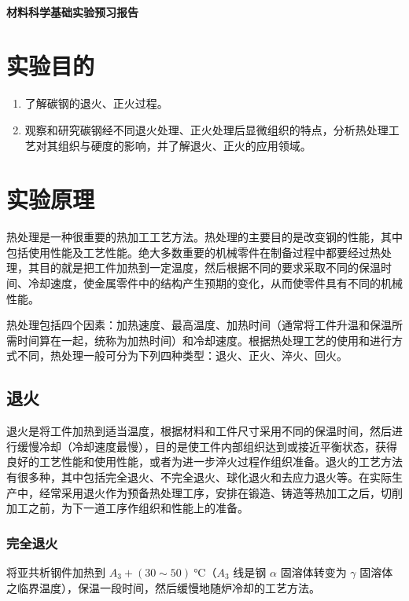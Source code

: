 \documentclass[a4paper,utf8]{article}
\begin{document}
\begin{center}
    {\mbox{}\\[7em]\bfseries\songti%
    材料科学基础实验预习报告}\\[34mm]
    \pointingbox
\end{center}
\newpage
\section{实验目的}
    \begin{enumerate}
        \item 了解碳钢的退火、正火过程。
        \item 观察和研究碳钢经不同退火处理、正火处理后显微组织的特点，分析热处理工艺对其组织与硬度的影响，并了解退火、正火的应用领域。
    \end{enumerate}
\section{实验原理}%
    热处理是一种很重要的热加工工艺方法。热处理的主要目的是改变钢的性能，其中包括使用性能及工艺性能。绝大多数重要的机械零件在制备过程中都要经过热处理，其目的就是把工件加热到一定温度，然后根据不同的要求采取不同的保温时间、冷却速度，使金属零件中的结构产生预期的变化，从而使零件具有不同的机械性能。\par
    热处理包括四个因素：加热速度、最高温度、加热时间（通常将工件升温和保温所需时间算在一起，统称为加热时间）和冷却速度。根据热处理工艺的使用和进行方式不同，热处理一般可分为下列四种类型：退火、正火、淬火、回火。\par
    \subsection{退火}
        退火是将工件加热到适当温度，根据材料和工件尺寸采用不同的保温时间，然后进行缓慢冷却（冷却速度最慢），目的是使工件内部组织达到或接近平衡状态，获得良好的工艺性能和使用性能，或者为进一步淬火过程作组织准备。退火的工艺方法有很多种，其中包括完全退火、不完全退火、球化退火和去应力退火等。在实际生产中，经常采用退火作为预备热处理工序，安排在锻造、铸造等热加工之后，切削加工之前，为下一道工序作组织和性能上的准备。
        \subsubsection{完全退火}
            将亚共析钢件加热到 $A_3+(30\sim 50)~\unit{\degreeCelsius}$（$A_3$ 线是钢 $\alpha$ 固溶体转变为 $\gamma$ 固溶体之临界温度），保温一段时间，然后缓慢地随炉冷却的工艺方法。
\end{document}
